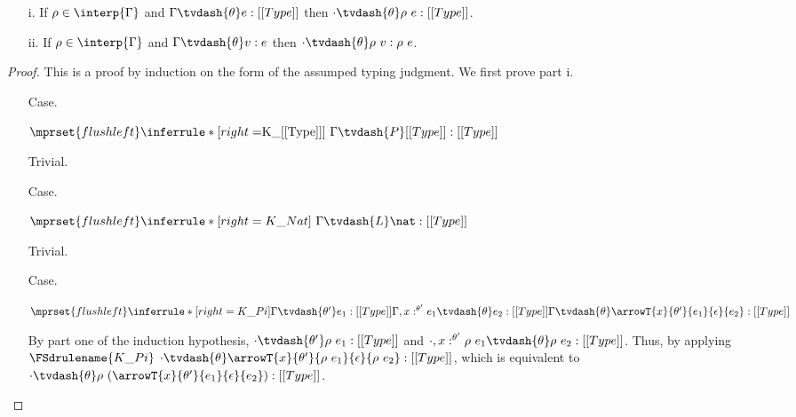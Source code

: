 \begin{lemma}
  \label{lemma:substitution_kinding_typing}
  \begin{itemize}
  \item[]
  \item[i.]   If $\rho \in \interp{\Gamma}$ and $\Gamma \tvdash{\theta} e:[[Type]]$ then 
    $\cdot \tvdash{\theta} \rho\ e:[[Type]]$.
  \item[ii.]   If $\rho \in \interp{\Gamma}$ and $\Gamma \tvdash{\theta} v:e$ then 
    $\cdot \tvdash{\theta} \rho\ v:\rho\ e$.
  \end{itemize}

\end{lemma}
\begin{proof}
  This is a proof by induction on the form of the assumped typing judgment.  We first prove
  part i.
  \begin{itemize}
  \item[Case.]\ \\
    \begin{center}
      \begin{math}
        $$\mprset{flushleft}
        \inferrule* [right=$K\_[[Type]]$ ] {
          \ 
        }{\Gamma \tvdash{P} [[Type]]:[[Type]]}
      \end{math}
    \end{center}
    Trivial.
    
    \item[Case.]\ \\
      \begin{center}
        \begin{math}
          $$\mprset{flushleft}
          \inferrule* [right=K\_Nat] {
            \ 
          }{\Gamma \tvdash{L} \nat:[[Type]]}
        \end{math}
      \end{center}
      Trivial.
      
    \item[Case.]\ \\
      \begin{center}
        \begin{math}
          $$\mprset{flushleft}
          \inferrule* [right=K\_Pi] {
            \Gamma \tvdash{\theta'} e_1:[[Type]]
            \\\\
            \Gamma,x:^{\theta'} e_1 \tvdash{\theta} e_2:[[Type]]
          }{\Gamma \tvdash{\theta} \arrowT{x}{\theta'}{e_1}{\epsilon}{e_2}:[[Type]]}
        \end{math}
      \end{center}
      By part one of the induction hypothesis, $\cdot \tvdash{\theta'} \rho\ e_1:[[Type]]$ and
      $\cdot,x:^{\theta'} \rho\ e_1 \tvdash{\theta} \rho\ e_2:[[Type]]$.  Thus, by applying 
      $\FSdrulename{K\_Pi}$ 
      $\cdot \tvdash{\theta} \arrowT{x}{\theta'}{\rho\ e_1}{\epsilon}{\rho\ e_2}:[[Type]]$, which
      is equivalent to 
      $\cdot \tvdash{\theta} \rho\ (\arrowT{x}{\theta'}{e_1}{\epsilon}{e_2}):[[Type]]$.
      

\end{itemize}
\end{proof}
